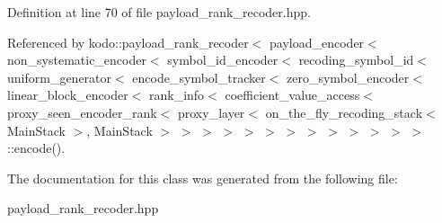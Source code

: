 Definition at line 70 of file payload\-\_\-rank\-\_\-recoder.\-hpp.



Referenced by kodo\-::payload\-\_\-rank\-\_\-recoder$<$ payload\-\_\-encoder$<$ non\-\_\-systematic\-\_\-encoder$<$ symbol\-\_\-id\-\_\-encoder$<$ recoding\-\_\-symbol\-\_\-id$<$ uniform\-\_\-generator$<$ encode\-\_\-symbol\-\_\-tracker$<$ zero\-\_\-symbol\-\_\-encoder$<$ linear\-\_\-block\-\_\-encoder$<$ rank\-\_\-info$<$ coefficient\-\_\-value\-\_\-access$<$ proxy\-\_\-seen\-\_\-encoder\-\_\-rank$<$ proxy\-\_\-layer$<$ on\-\_\-the\-\_\-fly\-\_\-recoding\-\_\-stack$<$ Main\-Stack $>$, Main\-Stack $>$ $>$ $>$ $>$ $>$ $>$ $>$ $>$ $>$ $>$ $>$ $>$ $>$\-::encode().



The documentation for this class was generated from the following file\-:\begin{DoxyCompactItemize}
\item 
payload\-\_\-rank\-\_\-recoder.\-hpp\end{DoxyCompactItemize}
